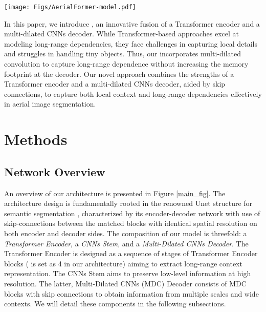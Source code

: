 \documentclass[journal]{IEEEtran}
\begin{document}
\begin{figure*}[!t]
\centering
\texttt{[image: Figs/AerialFormer-model.pdf]}
\caption{Overall network architecture of our proposed \model which consists of three components i.e., Transformer Encoder, CNNs Stem, and Multi-Dilated CNNs Decoder.}
\label{main_fig}
\end{figure*}


In this paper, we introduce \model, an innovative fusion of a Transformer encoder and a multi-dilated CNNs decoder. 
While Transformer-based approaches excel at modeling long-range dependencies, they face challenges in capturing local details and struggles in handling tiny objects. Thus, our \model incorporates multi-dilated convolution to capture long-range dependence without increasing the memory footprint at the decoder. Our novel \model approach combines the strengths of a Transformer encoder and a multi-dilated CNNs decoder, aided by skip connections, to capture both local context and long-range dependencies effectively in aerial image segmentation.
















\section{Methods}
\subsection{Network Overview}
An overview of our \model architecture is presented in Figure \ref{main_fig}. The architecture design is fundamentally rooted in the renowned Unet structure for semantic segmentation \cite{ronneberger2015u}, characterized by its encoder-decoder network with use of skip-connections between the matched blocks with identical spatial resolution on both encoder and decoder sides. The composition of our model is threefold: a\textit{ Transformer Encoder}, a \textit{CNNs Stem}, and a \textit{Multi-Dilated CNNs Decoder}. The Transformer Encoder is designed as a sequence of  stages of Transformer Encoder blocks ( is set as 4 in our architecture) aiming to extract long-range context representation. The CNNs Stem aims to preserve low-level information at high resolution. The latter, Multi-Dilated CNNs (MDC) Decoder consists of   MDC blocks with skip connections to obtain information from multiple scales and wide contexts. We will detail these components in the following subsections. 
\end{document}
